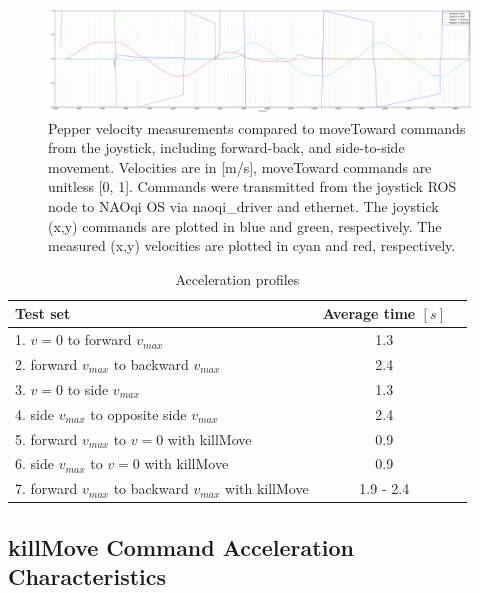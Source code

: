 \documentclass[11pt,a4paper]{article}
\begin{document}
\begin{figure}[h]
\centering
{}
\includegraphics[width=1\textwidth]{figures/PepperPerformance.pdf}
\caption{Pepper velocity measurements compared to moveToward commands from the joystick, including forward-back, and side-to-side movement. Velocities are in [m/s], moveToward commands are unitless [0, 1]. Commands were transmitted from the joystick ROS node to NAOqi OS via naoqi\_driver and ethernet. The joystick (x,y) commands are plotted in blue and green, respectively. The measured (x,y) velocities are plotted in cyan and red, respectively.}
\label{fig:xy_performance}
\end{figure}

\begin{table}[h]
  \centering
  \caption{Acceleration profiles}
  \label{tab:acc_profiles}
  \begin{tabular}{ l  c  c }
  \toprule
   Test set & Average time $[s]$ \\\midrule
   1. $v=0$ to forward $v_{\mathit{max}}$ & 1.3  \\
   2. forward $v_{\mathit{max}}$ to backward $v_{\mathit{max}}$ & 2.4  \\
   3. $v=0$ to side $v_{\mathit{max}}$ & 1.3  \\
   4. side $v_{\mathit{max}}$ to opposite side $v_{\mathit{max}}$ & 2.4  \\
   5. forward $v_{\mathit{max}}$ to $v=0$ with killMove & 0.9  \\
   6. side $v_{\mathit{max}}$ to $v=0$ with killMove & 0.9  \\
   7. forward $v_{\mathit{max}}$ to backward $v_{\mathit{max}}$ with killMove & 1.9 - 2.4  \\\bottomrule
  \end{tabular}
\end{table}

\subsection{killMove Command Acceleration Characteristics}\par
\end{document}

